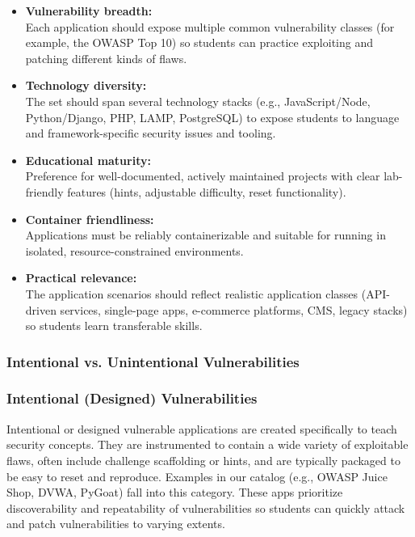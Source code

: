 \documentclass[12pt,titlepage]{article}
\begin{document}
\begin{itemize}
    \item \textbf{Vulnerability breadth:}\\ Each application should expose multiple common vulnerability classes (for example, the OWASP Top 10) so students can practice exploiting and patching different kinds of flaws.
    \item \textbf{Technology diversity:}\\ The set should span several technology stacks (e.g., JavaScript/Node, Python/Django, PHP, LAMP, PostgreSQL) to expose students to language and framework-specific security issues and tooling.
    \item \textbf{Educational maturity:}\\ Preference for well-documented, actively maintained projects with clear lab-friendly features (hints, adjustable difficulty, reset functionality).
    \item \textbf{Container friendliness:}\\ Applications must be reliably containerizable and suitable for running in isolated, resource-constrained environments.
    \item \textbf{Practical relevance:}\\ The application scenarios should reflect realistic application classes (API-driven services, single-page apps, e-commerce platforms, CMS, legacy stacks) so students learn transferable skills.
\end{itemize}

\subsubsection{Intentional vs. Unintentional Vulnerabilities}

\subsubsection*{Intentional (Designed) Vulnerabilities}
Intentional or designed vulnerable applications are created specifically to teach security concepts. They are instrumented to contain a wide variety of exploitable flaws, often include challenge scaffolding or hints, and are typically packaged to be easy to reset and reproduce. Examples in our catalog (e.g., OWASP Juice Shop, DVWA, PyGoat) fall into this category. These apps prioritize discoverability and repeatability of vulnerabilities so students can quickly attack and patch vulnerabilities to varying extents.
\end{document}
